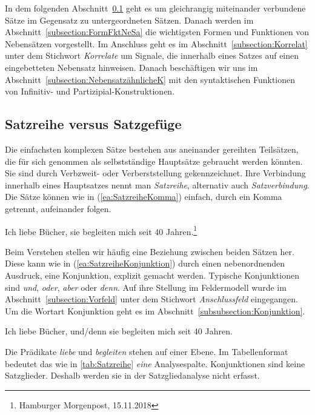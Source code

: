 In dem folgenden Abschnitt~\ref{subsection:SatzgefügeSatzreihe} geht es um gleichrangig miteinander verbundene Sätze im Gegensatz zu untergeordneten Sätzen. Danach werden im Abschnitt~\ref{subsection:FormFktNeSa} die wichtigsten Formen und Funktionen von Nebensätzen vorgestellt. Im Anschluss geht es im Abschnitt~\ref{subsection:Korrelat} unter dem Stichwort \textit{Korrelate} um Signale, die innerhalb eines Satzes auf einen eingebetteten Nebensatz hinweisen. Danach beschäftigen wir uns im Abschnitt~\ref{subsection:NebensatzähnlicheK} mit den syntaktischen Funktionen von Infinitiv- und Partizipial-Konstruktionen. 


\subsection{Satzreihe versus Satzgefüge}\label{subsection:SatzgefügeSatzreihe}

Die einfachsten komplexen Sätze bestehen aus aneinander gereihten Teilsätzen, die für sich genommen als selbstständige Hauptsätze gebraucht werden könnten. Sie sind durch Verbzweit- oder Verberststellung gekennzeichnet. Ihre Verbindung innerhalb eines Hauptsatzes nennt man \textit{Satzreihe}, alternativ auch \textit{Satzverbindung}. Die Sätze können wie in (\ref{ea:SatzreiheKomma}) einfach, durch ein Komma getrennt, aufeinander folgen. 


\ea \label{ea:SatzreiheKomma} Ich liebe Bücher, sie begleiten mich seit 40 Jahren.\footnote{Hamburger Morgenpost, 15.11.2018}
\z 

Beim Verstehen stellen wir häufig eine Beziehung zwischen beiden Sätzen her. Diese kann wie in (\ref{ea:SatzreiheKonjunktion}) durch einen nebenordnenden Ausdruck, eine Konjunktion, explizit gemacht werden. Typische Konjunktionen sind \textit{und}, \textit{oder}, \textit{aber} oder \textit{denn}. Auf ihre Stellung im Feldermodell wurde im Abschnitt~\ref{subsection:Vorfeld} unter dem Stichwort \textit{Anschlussfeld} eingegangen. Um die Wortart Konjunktion geht es im Abschnitt~\ref{subsubsection:Konjunktion}. 


\ea \label{ea:SatzreiheKonjunktion} Ich liebe Bücher, und/denn sie begleiten mich seit 40 Jahren.
\z 

Die Prädikate \textit{liebe} und \textit{begleiten} stehen auf einer Ebene. Im Tabellenformat bedeutet das wie in \ref{tab:Satzreihe} \textit{eine} Analysespalte. Konjunktionen sind keine Satzglieder. Deshalb werden sie in der Satzgliedanalyse nicht erfasst.

